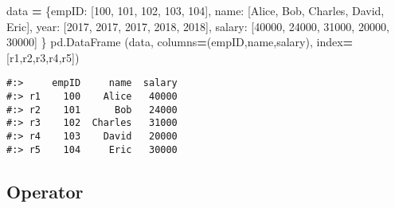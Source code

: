 \documentclass[
]{book}
\newenvironment{Shaded}{\begin{snugshade}}{\end{snugshade}}
\newcommand{\DecValTok}[1]{\textcolor[rgb]{0.06,0.06,0.06}{#1}}
\newcommand{\NormalTok}[1]{#1}
\newcommand{\OperatorTok}[1]{\textcolor[rgb]{0.43,0.43,0.43}{\textbf{#1}}}
\newcommand{\StringTok}[1]{\textcolor[rgb]{0.5,0.5,0.5}{#1}}
\begin{document}
\begin{Shaded}
\begin{Highlighting}[]
\NormalTok{data }\OperatorTok{=}\NormalTok{ \{}\StringTok{\textquotesingle{}empID\textquotesingle{}}\NormalTok{:  [}\DecValTok{100}\NormalTok{,      }\DecValTok{101}\NormalTok{,    }\DecValTok{102}\NormalTok{,      }\DecValTok{103}\NormalTok{,     }\DecValTok{104}\NormalTok{],}
        \StringTok{\textquotesingle{}name\textquotesingle{}}\NormalTok{:   [}\StringTok{\textquotesingle{}Alice\textquotesingle{}}\NormalTok{, }\StringTok{\textquotesingle{}Bob\textquotesingle{}}\NormalTok{,  }\StringTok{\textquotesingle{}Charles\textquotesingle{}}\NormalTok{, }\StringTok{\textquotesingle{}David\textquotesingle{}}\NormalTok{, }\StringTok{\textquotesingle{}Eric\textquotesingle{}}\NormalTok{],}
        \StringTok{\textquotesingle{}year\textquotesingle{}}\NormalTok{:   [}\DecValTok{2017}\NormalTok{,     }\DecValTok{2017}\NormalTok{,   }\DecValTok{2017}\NormalTok{,      }\DecValTok{2018}\NormalTok{,    }\DecValTok{2018}\NormalTok{],}
        \StringTok{\textquotesingle{}salary\textquotesingle{}}\NormalTok{: [}\DecValTok{40000}\NormalTok{,    }\DecValTok{24000}\NormalTok{,  }\DecValTok{31000}\NormalTok{,     }\DecValTok{20000}\NormalTok{,   }\DecValTok{30000}\NormalTok{] \}}
\NormalTok{pd.DataFrame (data, columns}\OperatorTok{=}\NormalTok{(}\StringTok{\textquotesingle{}empID\textquotesingle{}}\NormalTok{,}\StringTok{\textquotesingle{}name\textquotesingle{}}\NormalTok{,}\StringTok{\textquotesingle{}salary\textquotesingle{}}\NormalTok{), index}\OperatorTok{=}\NormalTok{[}\StringTok{\textquotesingle{}r1\textquotesingle{}}\NormalTok{,}\StringTok{\textquotesingle{}r2\textquotesingle{}}\NormalTok{,}\StringTok{\textquotesingle{}r3\textquotesingle{}}\NormalTok{,}\StringTok{\textquotesingle{}r4\textquotesingle{}}\NormalTok{,}\StringTok{\textquotesingle{}r5\textquotesingle{}}\NormalTok{])}
\end{Highlighting}
\end{Shaded}

\begin{verbatim}
#:>     empID     name  salary
#:> r1    100    Alice   40000
#:> r2    101      Bob   24000
#:> r3    102  Charles   31000
#:> r4    103    David   20000
#:> r5    104     Eric   30000
\end{verbatim}

\hypertarget{operator-2}{%
\subsection{Operator}\label{operator-2}}
\end{document}

